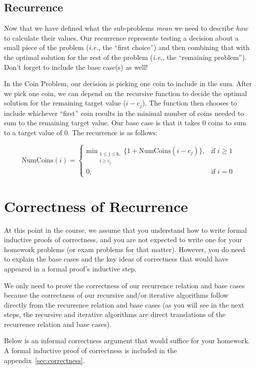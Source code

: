 \documentclass[11pt]{article}
\begin{document}
\subsection*{Recurrence}
Now that we have defined what the sub-problems \textit{mean} we need to describe \textit{how} to calculate their values. Our recurrence represents testing a decision about a small piece of the problem (\textit{i.e.}, the ``first choice'') and then combining that with the optimal solution for the rest of the problem (\textit{i.e.}, the ``remaining problem''). Don't forget to include the base case(s) as well! 

In the Coin Problem, our decision is picking one coin to include in the sum. After we pick one coin, we can depend on the recursive function to decide the optimal solution for the remaining target value ($i - c_j$). The function then chooses to include whichever ``first'' coin results in the minimal number of coins needed to sum to the remaining target value. Our base case is that it takes $0$ coins to sum to a target value of $0$. The recurrence is as follows:

\[
    \mathrm{NumCoins}(i) = 
\begin{cases}
    \mathrm{min_\substack{1 \leq j \leq k, \\ i \geq c_j}} \{ 1+ \mathrm{NumCoins}(i - c_j) \},& \text{if } i\geq 1\\
    0,              & \text{if } i=0
\end{cases}
\]

\section{Correctness of Recurrence}
At this point in the course, we assume that you understand how to write formal inductive proofs of correctness, and you are not expected to write one for your homework problems (or exam problems for that matter). However, you do need to explain the base cases and the key ideas of correctness that would have appeared in a formal proof's inductive step. 

We only need to prove the correctness of our recurrence relation and base cases because the correctness of our recursive and/or iterative algorithms follow directly from the recurrence relation and base cases (as you will see in the next steps, the recursive and iterative algorithms are direct translations of the recurrence relation and base cases).

Below is an informal correctness argument that would suffice for your homework. A formal inductive proof of correctness is included in the appendix~\ref{sec:correctness}.
\end{document}
